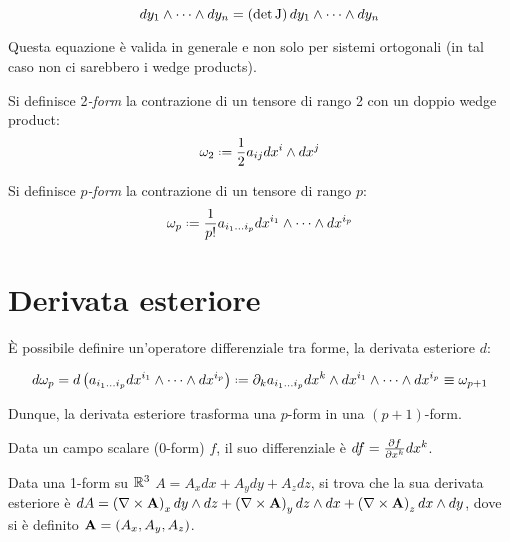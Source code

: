 \begin{equation}
	dy_1 \wedge \dots \wedge dy_n = \left( \det\mathrm{J} \right) dy_1 \wedge \dots \wedge dy_n
	\label{eq:3.5}
\end{equation}

Questa equazione è valida in generale e non solo per sistemi ortogonali (in tal caso non ci sarebbero i wedge products).

\begin{definition}
	Si definisce 2\textit{-form} la contrazione di un tensore di rango 2 con un doppio wedge product:
	\begin{equation}
		\omega_2 \defeq \frac{1}{2} a_{ij} dx^i \wedge dx^j
		\label{eq:3.6}
	\end{equation}
\end{definition}

\begin{definition}\label{p-form}
	Si definisce $ p $\textit{-form} la contrazione di un tensore di rango $ p $:
	\begin{equation}
		\omega_p \defeq \frac{1}{p!} a_{i_1 \dots i_p} dx^{i_1} \wedge \dots \wedge dx^{i_p}
		\label{eq:3.7}
	\end{equation}
\end{definition}

\section{Derivata esteriore}

È possibile definire un'operatore differenziale tra forme, la derivata esteriore $ d $:

\begin{equation}
	d\omega_p = d\left( a_{i_1 \dots i_p} dx^{i_1} \wedge \dots \wedge dx^{i_p} \right) \defeq \pa_k a_{i_1 \dots i_p} dx^k \wedge dx^{i_1} \wedge \dots \wedge dx^{i_p} \equiv \omega_{p+1}
	\label{eq:3.8}
\end{equation}

Dunque, la derivata esteriore trasforma una $ p $-form in una $ (p+1) $-form.

\begin{example}
	Data un campo scalare (0-form) $ f $, il suo differenziale è $ df = \frac{\partial f}{\partial x^k} dx^k $.
\end{example}

\begin{example}
	Data una 1-form su $ \mathbb{R}^3 $ $ A = A_x dx + A_y dy + A_z dz $, si trova che la sua derivata esteriore è $ dA = \left( \nabla\times\mathbf{A} \right)_x dy \wedge dz + \left( \nabla\times\mathbf{A} \right)_y dz \wedge dx + \left( \nabla\times\mathbf{A} \right)_z dx \wedge dy $, dove si è definito $ \mathbf{A} = \left( A_x, A_y, A_z \right) $.
\end{example}

